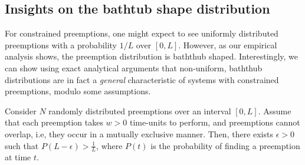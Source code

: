 

\subsection{Insights on the bathtub shape distribution}
\label{subsec:stat-mech}

For constrained preemptions, one might expect to see uniformly distributed preemptions with a probability $1/L$ over $[0, L]$. 
However, as our empirical analysis shows, the preemption distribution is baththub shaped.
Interestingly, we can show using exact analytical arguments that non-uniform, baththub distributions are in fact a \emph{general} characteristic of systems with constrained preemptions, modulo some assumptions. 

\begin{lemma}\label{lemma:1}
  Consider $N$ randomly distributed preemptions over an interval $[0, L]$.
  Assume that each preemption takes $w > 0$ time-units to perform, and preemptions cannot overlap, i.e, they occur in a mutually exclusive manner.
  Then, there exists $\epsilon > 0$ such that  $P(L-\epsilon) > \frac{1}{L}$, where 
 $P(t)$ is the probability of finding a preemption at time $t$. 
\end{lemma}


